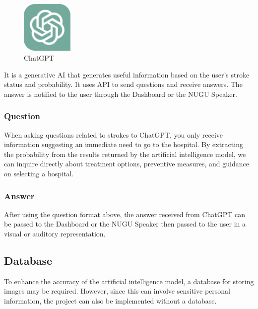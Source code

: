 \begin{figure}[htp]
\centering
\includegraphics[width=2.5cm]{images/chatgpt.png}
\caption{ChatGPT}
\label{fig:chatgpt}
\end{figure}

It is a generative AI that generates useful information based on the user's stroke status and probability. It uses API to send questions and receive answers. The answer is notified to the user through the Dashboard or the NUGU Speaker.\\
\subsubsection{Question}
When asking questions related to strokes to ChatGPT, you only receive information suggesting an immediate need to go to the hospital. By extracting the probability from the results returned by the artificial intelligence model, we can inquire directly about treatment options, preventive measures, and guidance on selecting a hospital.\\
\subsubsection{Answer}
After using the question format above, the answer received from ChatGPT can be passed to the Dashboard or the NUGU Speaker then passed to the user in a visual or auditory representation.\\

\subsection{Database}
To enhance the accuracy of the artificial intelligence model, a database for storing images may be required. However, since this can involve sensitive personal information, the project can also be implemented without a database.\\